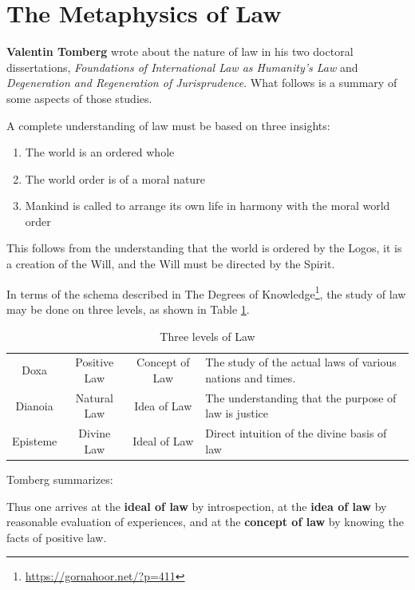 \section{The Metaphysics of Law}

\textbf{Valentin Tomberg} wrote about the nature of law in his two doctoral dissertations, \textit{Foundations of International Law as Humanity's Law} and \textit{Degeneration and Regeneration of Jurisprudence}. What follows is a summary of some aspects of those studies.

A complete understanding of law must be based on three insights:

\begin{enumerate}


\item The world is an ordered whole

\item The world order is of a moral nature

\item Mankind is called to arrange its own life in harmony with the moral world order
\end{enumerate}


This follows from the understanding that the world is ordered by the Logos, it is a creation of the Will, and the Will must be directed by the Spirit.

In terms of the schema described in The Degrees of Knowledge\footnote{\url{https://gornahoor.net/?p=411}}, the study of law may be done on three levels, as shown in Table \ref{tab:ThreeLevelsLaw}.

\begin{table}[h]\small\centering
\begin{tabular}{cccp{}}\toprule

Doxa & Positive Law & Concept of Law & The study of the actual laws of various nations and times.\\ 
Dianoia & Natural Law & Idea of Law & The understanding that the purpose of law is justice \\
Episteme & Divine Law & Ideal of Law & Direct intuition of the divine basis of law \\\bottomrule
\end{tabular}
\caption{Three levels of Law}
\label{tab:ThreeLevelsLaw}
\end{table}

Tomberg summarizes:

\begin{quotex}
Thus one arrives at the \textbf{ideal of law} by introspection, at the \textbf{idea of law} by reasonable evaluation of experiences, and at the \textbf{concept of law} by knowing the facts of positive law.
\end{quotex}


